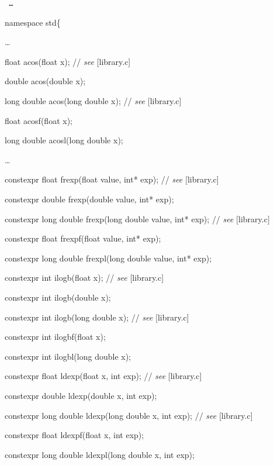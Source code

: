 \documentclass[prd,twocolumn,amsmath,amssymb,nofootinbib,eqsecnum]{revtex4-1}
\newcommand{\code}[1]{{\tt #1}}
\newcommand{\highlight}[1]{{\color{red} #1}}
\newcommand{\stdcomment}[1]{{// {\it see} [#1]}}
\begin{document}
\code{
\ldots
\vspace{2ex}

namespace std\{

\vspace{2ex}
\ldots
\vspace{2ex}

float acos(float x); \stdcomment{library.c}

double acos(double x);

long double acos(long double x); \stdcomment{library.c}

float acosf(float x);

long double acosl(long double x);

\vspace{2ex}
\ldots
\vspace{2ex}

\highlight{constexpr}  float frexp(float value, int* exp); \stdcomment{library.c}

\highlight{constexpr}  double frexp(double value, int* exp);

\highlight{constexpr}  long double frexp(long double value, int* exp); \stdcomment{library.c}

\highlight{constexpr}  float frexpf(float value, int* exp);

\highlight{constexpr}  long double frexpl(long double value, int* exp);

\vspace{2ex}

\highlight{constexpr} int ilogb(float x); \stdcomment{library.c}

\highlight{constexpr} int ilogb(double x);

\highlight{constexpr} int ilogb(long double x); \stdcomment{library.c}

\highlight{constexpr} int ilogbf(float x);

\highlight{constexpr} int ilogbl(long double x);

\vspace{2ex}

\highlight{constexpr} float ldexp(float x, int exp); \stdcomment{library.c}

\highlight{constexpr} double ldexp(double x, int exp);

\highlight{constexpr} long double ldexp(long double x, int exp); \stdcomment{library.c}

\highlight{constexpr} float ldexpf(float x, int exp);

\highlight{constexpr} long double ldexpl(long double x, int exp);

}
\end{document}
